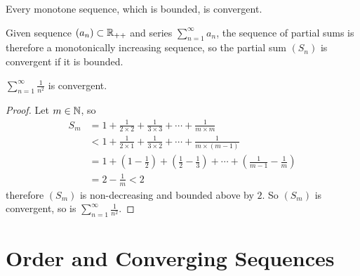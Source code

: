 \documentclass[11pt]{article}
\newcommand{\ser}[2]{\sum_{{#2}=1}^\infty {#1}_{#2}}
\begin{document}
        \begin{theorem}
            Every monotone sequence, which is bounded, is convergent.
        \end{theorem}
        
        \begin{corollary}
            Given sequence $(a_n) \subset \mathbb{R}_{++}$ and series $\ser{a}{n}$, the sequence of partial sums is therefore a monotonically increasing sequence, so the partial sum $(S_n)$ is convergent if it is bounded.
        \end{corollary}
        
        \begin{example}
            $\sum_{n=1}^\infty \frac{1}{n^2}$ is convergent.
        \end{example}
        
        \begin{proof}
            Let $m \in \mathbb{N}$, so
            \begin{align}
                S_m &= 1 + \frac{1}{2\times 2} + \frac{1}{3 \times 3} + \cdots + \frac{1}{m \times m} \\
                &< 1 + \frac{1}{2\times 1} + \frac{1}{3\times 2} + \cdots + \frac{1}{m \times (m-1)} \\
                &= 1 + (1-\frac{1}{2}) + (\frac{1}{2} - \frac{1}{3}) + \cdots + (\frac{1}{m-1} - \frac{1}{m}) \\
                &= 2 - \frac{1}{m} < 2
            \end{align}
            therefore $(S_m)$ is non-decreasing and bounded above by $2$. So $(S_m)$ is convergent, so is  $\sum_{n=1}^\infty \frac{1}{n^2}$.
        \end{proof}
        
    \section{Order and Converging Sequences}
        \begin{proposition}
            
        \end{proposition}
\end{document}
